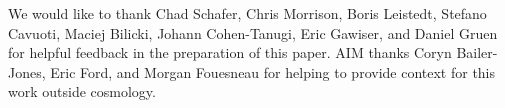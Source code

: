 We would like to thank Chad Schafer, Chris Morrison, Boris Leistedt, Stefano 
Cavuoti, Maciej Bilicki, Johann Cohen-Tanugi, Eric Gawiser, and Daniel Gruen 
for helpful feedback in the preparation of this paper.
AIM thanks Coryn Bailer-Jones, Eric Ford, and Morgan Fouesneau for helping to 
provide context for this work outside cosmology.
